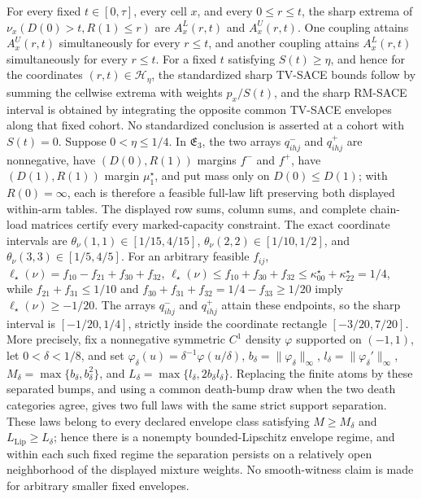 For every fixed \(t\in[0,\tau]\), every cell \(x\), and every \(0\leq r\leq t\), the sharp extrema of \(\nu_x(D(0)>t,R(1)\leq r)\) are \(A^L_x(r,t)\) and \(A^U_x(r,t)\).  One coupling attains \(A^U_x(r,t)\) simultaneously for every \(r\leq t\), and another coupling attains \(A^L_x(r,t)\) simultaneously for every \(r\leq t\).  For a fixed \(t\) satisfying \(S(t)\geq\eta\), and hence for the coordinates \((r,t)\in\mathcal H_\eta\), the standardized sharp TV-SACE bounds follow by summing the cellwise extrema with weights \(p_x/S(t)\), and the sharp RM-SACE interval is obtained by integrating the opposite common TV-SACE envelopes along that fixed cohort.  No standardized conclusion is asserted at a cohort with \(S(t)=0\).
Suppose \(0<\eta\leq1/4\).  In \(\mathfrak E_3\), the two arrays \(q^-_{ihj}\) and \(q^+_{ihj}\) are nonnegative, have \((D(0),R(1))\) margins \(f^-\) and \(f^+\), have \((D(1),R(1))\) margin \(\mu_1^\star\), and put mass only on \(D(0)\leq D(1)\); with \(R(0)=\infty\), each is therefore a feasible full-law lift preserving both displayed within-arm tables.  The displayed row sums, column sums, and complete chain-load matrices certify every marked-capacity constraint.  The exact coordinate intervals are \(\theta_\nu(1,1)\in[1/15,4/15]\), \(\theta_\nu(2,2)\in[1/10,1/2]\), and \(\theta_\nu(3,3)\in[1/5,4/5]\).  For an arbitrary feasible \(f_{ij}\), \(\ell_\star(\nu)=f_{10}-f_{21}+f_{30}+f_{32}\), \(\ell_\star(\nu)\leq f_{10}+f_{30}+f_{32}\leq\kappa^\star_{00}+\kappa^\star_{22}=1/4\), while \(f_{21}+f_{31}\leq1/10\) and \(f_{30}+f_{31}+f_{32}=1/4-f_{33}\geq1/20\) imply \(\ell_\star(\nu)\geq-1/20\).  The arrays \(q^-_{ihj}\) and \(q^+_{ihj}\) attain these endpoints, so the sharp interval is \([-1/20,1/4]\), strictly inside the coordinate rectangle \([-3/20,7/20]\).  More precisely, fix a nonnegative symmetric \(C^1\) density \(\varphi\) supported on \((-1,1)\), let \(0<\delta<1/8\), and set \(\varphi_\delta(u)=\delta^{-1}\varphi(u/\delta)\), \(b_\delta=\|\varphi_\delta\|_\infty\), \(l_\delta=\|\varphi_\delta'\|_\infty\), \(M_\delta=\max\{b_\delta,b_\delta^2\}\), and \(L_\delta=\max\{l_\delta,2b_\delta l_\delta\}\).  Replacing the finite atoms by these separated bumps, and using a common death-bump draw when the two death categories agree, gives two full laws with the same strict support separation.  These laws belong to every declared envelope class satisfying \(M\geq M_\delta\) and \(L_{\mathrm{Lip}}\geq L_\delta\); hence there is a nonempty bounded-Lipschitz envelope regime, and within each such fixed regime the separation persists on a relatively open neighborhood of the displayed mixture weights.  No smooth-witness claim is made for arbitrary smaller fixed envelopes.

